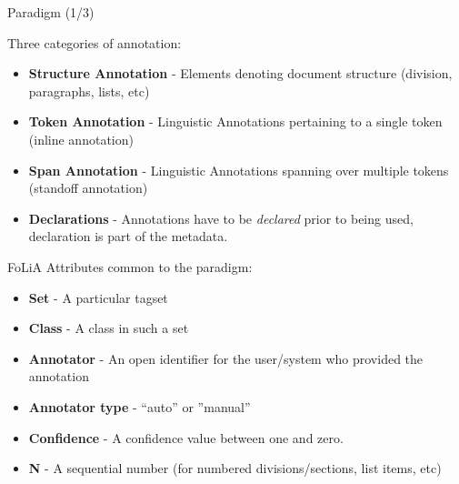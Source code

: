 \documentclass[compress]{beamer}
\begin{document}
\begin{frame}
    \begin{block}{Paradigm (1/3)}
            
        
        Three categories of annotation:    
        \begin{itemize}            
            \item \textbf{Structure Annotation} - Elements denoting document structure (division, paragraphs, lists, etc)
            \item \textbf{Token Annotation} - Linguistic Annotations pertaining to a single token (inline annotation)
            \item \textbf{Span Annotation} - Linguistic Annotations spanning over multiple tokens (standoff annotation)
        \end{itemize}
        
        \begin{itemize}            
            \item \textbf{Declarations} - Annotations have to be \emph{declared} prior to being used, declaration is part of the metadata.
        \end{itemize}
    
    
        FoLiA Attributes common to the paradigm:
        \begin{itemize}
            \item \textbf{Set} - A particular tagset
            \item \textbf{Class} - A class in such a set
            \item \textbf{Annotator} - An open identifier for the user/system who provided the annotation
            \item \textbf{Annotator type} - ``auto'' or ''manual''
            \item \textbf{Confidence} - A confidence value between one and zero.
            \item \textbf{N} - A sequential number (for numbered divisions/sections, list items, etc)            
        \end{itemize}
            
    \end{block}
\end{frame}
\end{document}
